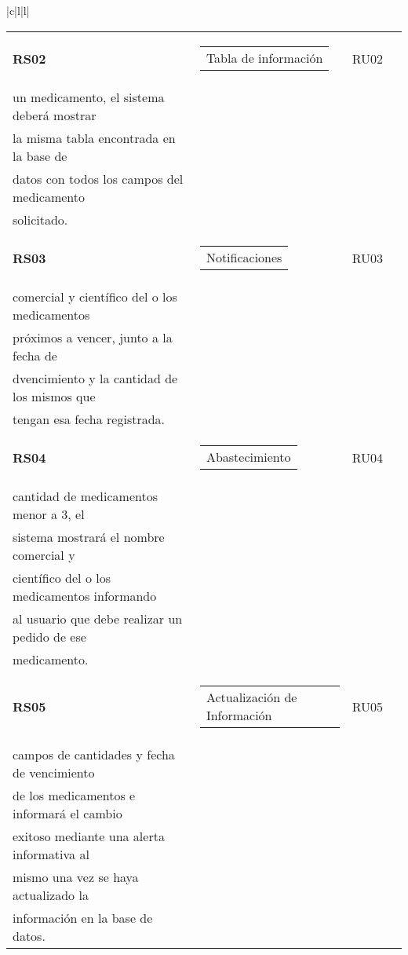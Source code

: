 \begin{longtable}[c]{|c|l|l|}
\begin{longtable}[c]{|l|l|l|l|}
\textbf{RS02} & \begin{tabular}[c]{@{}l@{}}Tabla de información\end{tabular} & RU02 & \begin{tabular}[c]{@{}l@{}}Al solicitar la generación de la información de \\ un medicamento, el sistema deberá mostrar\\ la misma tabla encontrada en la base de\\ datos con todos los campos del medicamento\\ solicitado.\end{tabular} \\ \hline

\textbf{RS03} & \begin{tabular}[c]{@{}l@{}}Notificaciones\end{tabular} & RU03 & \begin{tabular}[c]{@{}l@{}}El sistema deberá presentar el nombre \\ comercial y científico del o los medicamentos\\ próximos a vencer, junto a la fecha de\\ dvencimiento y la cantidad de los mismos que\\ tengan esa fecha registrada.\end{tabular} \\ \hline

\textbf{RS04} & \begin{tabular}[c]{@{}l@{}}Abastecimiento\end{tabular} & RU04 & \begin{tabular}[c]{@{}l@{}}Al momento de recibir un cambio de la \\ cantidad de medicamentos menor a 3, el \\ sistema mostrará el nombre comercial y \\ científico del o los medicamentos informando\\ al usuario que debe realizar un pedido de ese \\ medicamento. \end{tabular} \\ \hline

\textbf{RS05} & \begin{tabular}[c]{@{}l@{}}Actualización de Información\end{tabular} & RU05 & \begin{tabular}[c]{@{}l@{}}El sistema permitirá al usuario cambiar los \\ campos de cantidades y fecha de vencimiento \\ de los medicamentos e informará el cambio \\ exitoso mediante una alerta informativa al\\ mismo una vez se haya actualizado la \\ información en la base de datos. \end{tabular} \\ \hline


\end{longtable}
\end{longtable}
